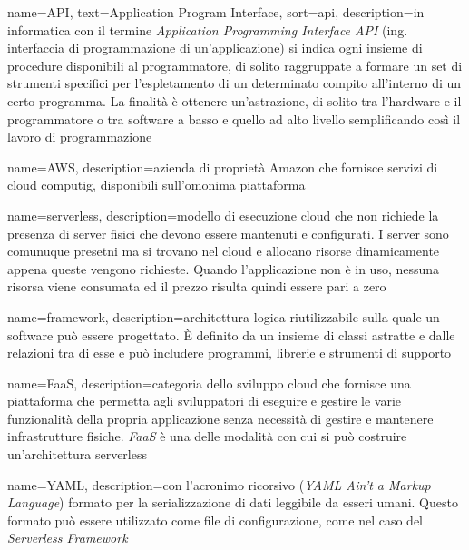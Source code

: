 
{
	name=API,
	text=Application Program Interface,
	sort=api,
	description={in informatica con il termine \emph{Application Programming Interface API} (ing. interfaccia di programmazione di un'applicazione) si indica ogni insieme di procedure disponibili al programmatore, di solito raggruppate a formare un set di strumenti specifici per l'espletamento di un determinato compito all'interno di un certo programma. La finalità è ottenere un'astrazione, di solito tra l'hardware e il programmatore o tra software a basso e quello ad alto livello semplificando così il lavoro di programmazione}
}



{
	name=AWS,
	description={azienda di proprietà Amazon che fornisce servizi di cloud computig, disponibili sull'omonima piattaforma}
}

{
	name=serverless,
	description={modello di esecuzione cloud che non richiede la presenza di server fisici che devono essere mantenuti e configurati. I server sono comunuque presetni ma si trovano nel cloud e allocano risorse dinamicamente appena queste vengono richieste. Quando l'applicazione non è in uso, nessuna risorsa viene consumata ed il prezzo risulta quindi essere pari a zero}
}

{
	name=framework,
	description={architettura logica riutilizzabile sulla quale un software può essere progettato. È definito da un insieme di classi astratte e dalle relazioni tra di esse e può includere programmi, librerie e strumenti di supporto}
}

{
	name=FaaS,
	description={categoria dello sviluppo cloud che fornisce una piattaforma che permetta agli sviluppatori di eseguire e gestire le varie funzionalità della propria applicazione senza necessità di gestire e mantenere infrastrutture fisiche. \emph{FaaS} è una delle modalità con cui si può costruire un'architettura \gls{serverless}}
}

{
	name=YAML,
	description={con l’acronimo ricorsivo (\emph{YAML Ain’t a Markup Language}) formato per la serializzazione di dati leggibile da esseri umani. Questo formato può essere utilizzato come file di configurazione, come nel caso del \emph{Serverless Framework}}
}

